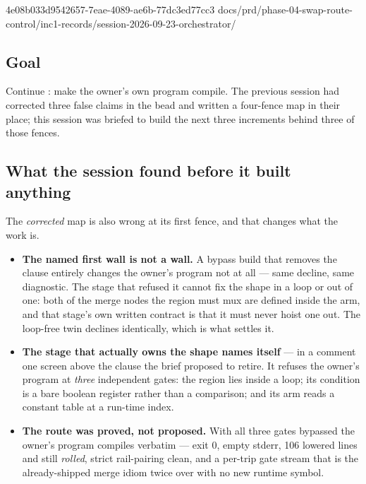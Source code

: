 %
  {4e08b033}{d9542657-7eae-4089-ae6b-77dc3ed77cc3}%
  {docs/prd/phase-04-swap-route-control/inc1-records/session-2026-09-23-orchestrator/}

\subsection*{Goal}
Continue : make the owner's own program compile. The previous session had corrected three
false claims in the bead and written a four-fence map in their place; this session was briefed to
build the next three increments behind three of those fences.

\subsection*{What the session found before it built anything}
The \emph{corrected} map is also wrong at its first fence, and that changes what the work is.

\begin{itemize}
  \item \textbf{The named first wall is not a wall.} A bypass build that removes the clause entirely
        changes the owner's program not at all --- same decline, same diagnostic. The stage that
        refused it cannot fix the shape in a loop or out of one: both of the merge nodes the region
        must mux are defined inside the arm, and that stage's own written contract is that it must
        never hoist one out. The loop-free twin declines identically, which is what settles it.
  \item \textbf{The stage that actually owns the shape names itself} --- in a comment one screen
        above the clause the brief proposed to retire. It refuses the owner's program at
        \emph{three} independent gates: the region lies inside a loop; its condition is a bare
        boolean register rather than a comparison; and its arm reads a constant table at a run-time
        index.
  \item \textbf{The route was proved, not proposed.} With all three gates bypassed the owner's
        program compiles verbatim --- exit 0, empty stderr, 106 lowered lines and still \emph{rolled},
        strict rail-pairing clean, and a per-trip gate stream that is the already-shipped merge idiom
        twice over with no new runtime symbol.
\end{itemize}

